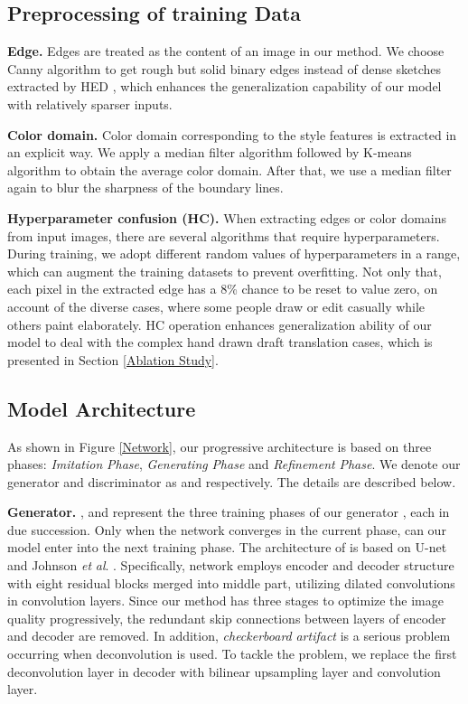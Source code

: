 \documentclass[10pt,twocolumn,letterpaper]{article} \usepackage{amsfonts,amssymb}
\begin{document}
\subsection{Preprocessing of training Data} \label{Preprocessing of training Data}

{\bf Edge.}
Edges are treated as the content of an image in our method. We choose Canny algorithm \cite{canny1987computational} to get rough but solid binary edges instead of dense sketches extracted by HED \cite{xie2015holistically}, which enhances the generalization capability of our model with relatively sparser inputs.

{\bf Color domain.}
Color domain corresponding to the style features is extracted in an explicit way. We apply a median filter algorithm followed by K-means \cite{coates2012learning} algorithm to obtain the average color domain.  After that, we use a median filter again to blur the sharpness of the boundary lines.

{\bf Hyperparameter confusion (HC).}
When extracting edges or color domains from input images, there are several algorithms that require hyperparameters. During training, we adopt different random values of hyperparameters in a range, which can augment the training datasets to prevent overfitting. Not only that, each pixel in the extracted edge has a 8\% chance to be reset to value zero, on account of the diverse cases, where some people draw or edit casually while others paint elaborately. HC operation enhances generalization ability of our model to deal with the complex hand drawn draft translation cases, which is presented in Section \ref{Ablation Study}.

\subsection{Model Architecture} \label{Model Architecture}
As shown in Figure \ref{Network}, our progressive architecture is based on three phases: \emph{Imitation} \emph{Phase}, \emph{Generating} \emph{Phase} and \emph{Refinement} \emph{Phase}. We denote our generator and discriminator as  and  respectively. The details are described below.

{\bf Generator.}
,  and  represent the three training phases of our generator , each in due succession. Only when the network converges in the current phase, can our model enter into the next training phase. The architecture of  is based on U-net \cite{ronneberger2015u} and  Johnson \emph{et} \emph{al}. \cite{johnson2016perceptual}. Specifically,  network employs encoder and decoder structure with eight residual blocks \cite{he2016deep} merged into middle part, utilizing dilated convolutions in convolution layers. Since our method has three stages to optimize the image quality progressively, the redundant skip connections between layers of encoder and decoder are removed. In addition, \emph{checkerboard} \emph{artifact} is a serious problem \cite{odena2016deconvolution} occurring when deconvolution is used. To tackle the problem, we replace the first deconvolution layer in decoder with bilinear upsampling layer and convolution layer.
\end{document}
